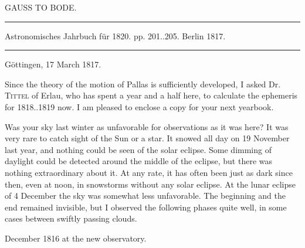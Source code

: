 \clearpage{}\hypertarget{native-404-part-lower}{}\label{native-404-part-lower}
\begin{center}\large GAUSS TO BODE.\end{center}
\begin{center}\hrule\vspace{4pt}\fontsize{10}{12}\selectfont
Astronomisches Jahrbuch für 1820. pp. 201..205. Berlin 1817.\par\vspace{4pt}\hrule\vspace{4pt}\end{center}
\begin{flushright}Göttingen, 17 March 1817.\end{flushright}
\par\indent Since the theory of the motion of Pallas is sufficiently developed, I asked Dr. \textsc{Tittel} of Erlau, who has spent a year and a half here, to calculate the ephemeris for 1818..1819  now. I am pleased to enclose a copy for your next yearbook.

\par\indent Was your sky last winter as unfavorable for observations as it was here? It was very rare to catch sight of the Sun or a star. It snowed all day on 19 November last year, and nothing could be seen of the solar eclipse. Some dimming of daylight could be detected around the middle of the eclipse, but there was nothing extraordinary about it. At any rate, it has often been just as dark since then, even at noon, in snowstorms without any solar eclipse. At the lunar eclipse of 4 December the sky was somewhat less unfavorable. The beginning and the end remained invisible, but I observed the following phases quite well, in some cases between swiftly passing clouds.

\par{} December 1816 at the new observatory.

